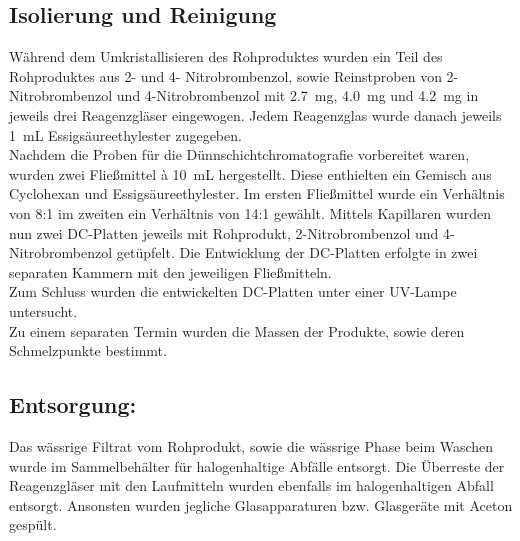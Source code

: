 \subsection*{Isolierung und Reinigung}
Während dem Umkristallisieren des Rohproduktes wurden ein Teil des Rohproduktes aus 2- und 4- Nitrobrombenzol, sowie Reinstproben von 2-Nitrobrombenzol und 4-Nitrobrombenzol mit \SI{2,7}{\milli \gram}, \SI{4,0}{\milli \gram} und \SI{4,2}{\milli \gram} in jeweils drei Reagenzgläser eingewogen. Jedem Reagenzglas wurde danach jeweils \SI{1}{\milli \liter} Essigsäureethylester zugegeben.\\
Nachdem die Proben für die Dünnschichtchromatografie vorbereitet waren, wurden zwei Fließmittel à \SI{10}{\milli \liter} hergestellt. Diese enthielten ein Gemisch aus Cyclohexan und Essigsäureethylester. Im ersten Fließmittel wurde ein Verhältnis von 8:1 im zweiten ein Verhältnis von 14:1 gewählt. Mittels Kapillaren wurden nun zwei DC-Platten jeweils mit Rohprodukt, 2-Nitrobrombenzol und 4-Nitrobrombenzol getüpfelt. Die Entwicklung der DC-Platten erfolgte in zwei separaten Kammern mit den jeweiligen Fließmitteln. \\
Zum Schluss wurden die entwickelten DC-Platten unter einer UV-Lampe untersucht.\\
Zu einem separaten Termin wurden die Massen der Produkte, sowie deren Schmelzpunkte bestimmt.

\subsection*{Entsorgung:}
Das wässrige Filtrat vom Rohprodukt, sowie die wässrige Phase beim Waschen wurde im Sammelbehälter für halogenhaltige Abfälle entsorgt. Die Überreste der Reagenzgläser mit den Laufmitteln wurden ebenfalls im halogenhaltigen Abfall entsorgt. Ansonsten wurden jegliche Glasapparaturen bzw. Glasgeräte mit Aceton gespült.
